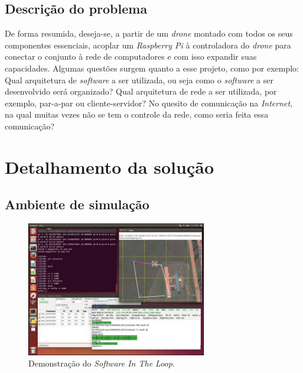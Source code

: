 \documentclass[12pt,a4paper,oneside]{book}
\begin{document}
\section{Descrição do problema}
De forma resumida, deseja-se, a partir de um \textit{drone} montado com todos os seus componentes essenciais, acoplar um \textit{Raspberry Pi} à controladora do \textit{drone} para conectar o conjunto à rede de computadores e com isso expandir suas capacidades. Algumas questões surgem quanto a esse projeto, como por exemplo: Qual arquitetura de \textit{software} a ser utilizada, ou seja como o \textit{software} a ser desenvolvido será organizado? Qual arquitetura de rede a ser utilizada, por exemplo, par-a-par ou cliente-servidor? No quesito de comunicação na \textit{Internet}, na qual muitas vezes não se tem o controle da rede, como seria feita essa comunicação?

%
\chapter{Detalhamento da solução}
%
\thispagestyle{empty} 
%

\section{Ambiente de simulação}
%
\begin{figure}[!htbp]
  \centering
  \includegraphics[width=0.7\textwidth]{Images/Desenvolvimento/sitl_demo.jpg}
  \caption{Demonstração do \textit{Software In The Loop}.}
  \label{fig:sitl_demo.jpg.0}
\end{figure}
%
\end{document}
